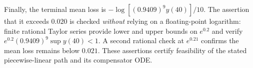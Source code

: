 \documentclass[review,hidelinks,onefignum,onetabnum]{siamonline250211}
\begin{document}
Finally, the terminal mean loss is $-\log[(0.9409)^9 y(40)]/10$. The assertion that it exceeds $0.020$ is checked \emph{without} relying on a floating-point logarithm: finite rational Taylor series provide lower and upper bounds on $e^{0.2}$ and verify $e^{0.2}(0.9409)^9\sup y(40)<1$. A second rational check at $e^{0.21}$ confirms the mean loss remains below $0.021$. These assertions certify feasibility of the stated piecewise-linear path and its compensator ODE.


\enlargethispage{2\baselineskip}

\end{document}
